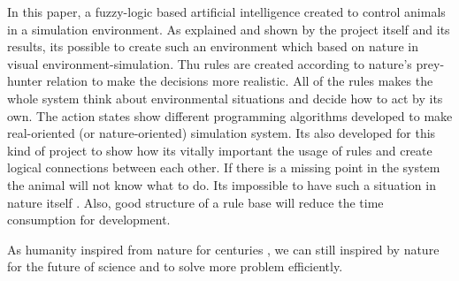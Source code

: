 In this paper, a fuzzy-logic based artificial intelligence created to control animals  in a simulation environment. As explained and shown by the project itself and its results, its possible to create such an environment which based on nature in visual environment-simulation. Thu rules are created according to nature's prey-hunter relation to make the decisions more realistic. All of the rules makes the whole system think about environmental situations and decide how to act by its own. The action states show different programming algorithms developed to make real-oriented (or nature-oriented) simulation system. Its also developed for this kind of project to show how its vitally important the usage of rules and create logical connections between each other. If there is a missing point in the system the animal will not know what to do. Its impossible to have such a situation in nature itself . Also, good structure of a rule base will reduce the time consumption for development.


As humanity inspired from nature for centuries , we can still inspired by nature for the future of science and to solve more problem efficiently. 